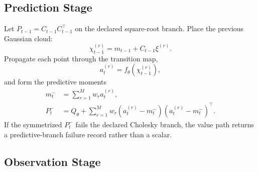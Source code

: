 \documentclass[11pt]{article}
\numberwithin{equation}{section}
\begin{document}
\subsection{Prediction Stage}

Let \(P_{t-1}=C_{t-1}C_{t-1}^\top\) on the declared square-root branch.  Place
the previous Gaussian cloud:
\begin{equation}
  \chi_{t-1}^{(r)}=m_{t-1}+C_{t-1}\xi^{(r)}.
  \label{eq:p31-pred-placed-points}
\end{equation}
Propagate each point through the transition map,
\begin{equation}
  a_t^{(r)}=f_\theta(\chi_{t-1}^{(r)}),
  \label{eq:p31-transition-points}
\end{equation}
and form the predictive moments
\begin{align}
  m_t^- &= \sum_{r=1}^{M} w_r a_t^{(r)},
  \label{eq:p31-pred-mean}\\
  P_t^- &= Q_\theta +
  \sum_{r=1}^{M}w_r(a_t^{(r)}-m_t^-)(a_t^{(r)}-m_t^-)^\top.
  \label{eq:p31-pred-cov}
\end{align}
If the symmetrized \(P_t^-\) fails the declared Cholesky branch, the value path
returns a predictive-branch failure record rather than a scalar.

\subsection{Observation Stage}
\end{document}
